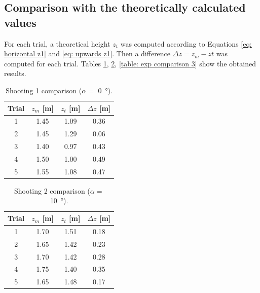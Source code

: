 		\subsection{Comparison with the theoretically calculated values}

			For each trial, a theoretical height $z_{t}$ was computed according to Equations \eqref{eq: horizontal z1} and \eqref{eq: upwards z1}. Then a difference $ \Delta z = z_{m} - z{t}$ was computed for each trial. Tables \ref{table: exp comparison 1}, \ref{table: exp comparison 2}, \ref{table: exp comparison 3} show the obtained results.
			

			\begin{table}\centering
			\begin{tabular}{@{}cccc@{}}\toprule
			Trial & $ z_m$ [m] & $z_t$ [m] & $\Delta z$ [m] \\ \midrule

			1 & 1.45 & 1.09 & 0.36 \\
			2 & 1.45 & 1.29 & 0.06 \\
			3 & 1.40 & 0.97 & 0.43 \\
			4 & 1.50 & 1.00 & 0.49 \\
			5 & 1.55 & 1.08 & 0.47 \\
		
			\bottomrule
			\end{tabular}
			\caption{Shooting 1 comparison ($\alpha = $ \SI{0}{\degree}).}
			\label{table: exp comparison 1}
			\end{table}
			

			\begin{table}\centering
			\begin{tabular}{@{}cccc@{}}\toprule
			Trial & $ z_m$ [m] & $z_t$ [m] & $\Delta z$ [m] \\ \midrule

			1 & 1.70 & 1.51 & 0.18 \\
			2 & 1.65 & 1.42 & 0.23 \\
			3 & 1.70 & 1.42 & 0.28 \\
			4 & 1.75 & 1.40 & 0.35 \\
			5 & 1.65 & 1.48 & 0.17 \\
		
			\bottomrule
			\end{tabular}
			\caption{Shooting 2 comparison ($\alpha = $ \SI{10}{\degree}).}
			\label{table: exp comparison 2}
			\end{table}

